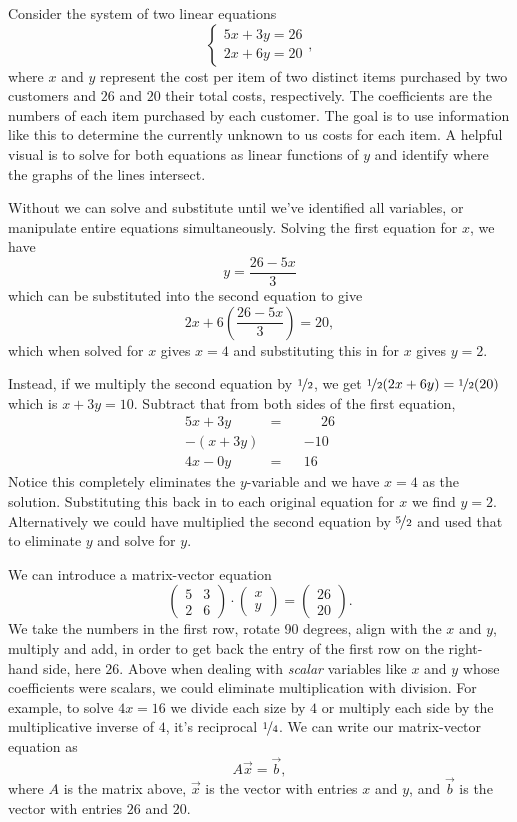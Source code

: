 \documentclass{article}
\begin{document}
Consider the system of two linear equations \[\begin{cases} 5x + 3y = 26\\
2x+6y=20
\end{cases},\] where \(x\) and \(y\) represent the cost per item of two distinct items purchased by two customers and \(26\) and \(20\) their total costs, respectively. The coefficients are the numbers of each item purchased by each customer.  The goal is to use information like this to determine the currently unknown to us costs for each item.  A helpful visual is to solve for both equations as linear functions of \(y\) and identify where the graphs of the lines intersect.

Without we can solve and substitute until we've identified all variables, or manipulate entire equations simultaneously.  Solving the first equation for \(x\), we have \[y = \frac{26- 5x}{3}\] which can be substituted into the second equation to give \[2x + 6\left(\frac{26- 5x}{3}\right) = 20,\] which when solved for \(x\) gives \(x = 4\) and substituting this in for \(x\) gives \(y = 2\).

Instead, if we multiply the second equation by \(\nicefrac{1}{2}\), we get \(\nicefrac{1}{2}(2x+6y) =\nicefrac{1}{2}(20)\) which is \(x+3y = 10\).  Subtract that from both sides of the first equation,
\begin{alignat*}
5x+3y &= &&\phantom{-}26\\
- (x+3y) &\phantom{=} &&-10\\
\hline
4x - 0y &= &&16
\end{alignat*}
Notice this completely eliminates the \(y\)-variable and we have \(x = 4\) as the solution.  Substituting this back in to each original equation for \(x\) we find \(y = 2\).  Alternatively we could have multiplied the second equation by \(\nicefrac{5}{2}\) and used that to eliminate \(y\) and solve for \(y\).

We can introduce a matrix-vector equation \[\begin{pmatrix}5&3\\2&6\end{pmatrix} \cdot \begin{pmatrix}x\\y\end{pmatrix} = \begin{pmatrix}26\\20\end{pmatrix}.\] We take the numbers in the first row, rotate 90 degrees, align with the \(x\) and \(y\), multiply and add, in order to get back the entry of the first row on the right-hand side, here \(26\).  Above when dealing with \emph{scalar} variables like \(x\) and \(y\) whose coefficients were scalars, we could eliminate multiplication with division.  For example, to solve \(4x = 16\) we divide each size by \(4\) or multiply each side by the multiplicative inverse of \(4\), it's reciprocal \(\nicefrac{1}{4}\). We can write our matrix-vector equation as \[A\vec{x} = \vec{b},\] where \(A\) is the matrix above, \(\vec{x}\) is the vector with entries \(x\) and \(y\), and \(\vec{b}\) is the vector with entries \(26\) and \(20\).  
\end{document}
